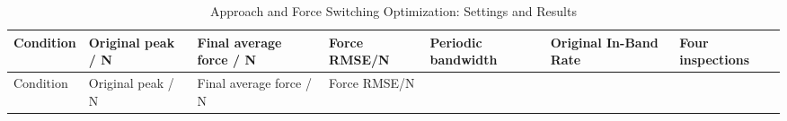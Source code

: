 \FloatBarrier\begingroup\small\setlength{\tabcolsep}{2.5pt}
\begin{longtable}[]{@{}
  >{\raggedright\arraybackslash}p{}
  >{\raggedright\arraybackslash}p{}
  >{\raggedright\arraybackslash}p{}
  >{\raggedright\arraybackslash}p{}
  >{\raggedright\arraybackslash}p{}
  >{\raggedright\arraybackslash}p{}
  >{\raggedright\arraybackslash}p{}@{}}
\caption{Approach and Force Switching Optimization: Settings and Results}\label{tab:s14-1}\tabularnewline
\toprule\noalign{}
\begin{minipage}[b]{\linewidth}\raggedright
Condition
\end{minipage} & \begin{minipage}[b]{\linewidth}\raggedright
Original peak / N
\end{minipage} & \begin{minipage}[b]{\linewidth}\raggedright
Final average force / N
\end{minipage} & \begin{minipage}[b]{\linewidth}\raggedright
Force RMSE/N
\end{minipage} & \begin{minipage}[b]{\linewidth}\raggedright
Periodic bandwidth
\end{minipage} & \begin{minipage}[b]{\linewidth}\raggedright
Original In-Band Rate
\end{minipage} & \begin{minipage}[b]{\linewidth}\raggedright
Four inspections
\end{minipage} \\
\midrule\noalign{}
\endfirsthead
\toprule\noalign{}
\begin{minipage}[b]{\linewidth}\raggedright
Condition
\end{minipage} & \begin{minipage}[b]{\linewidth}\raggedright
Original peak / N
\end{minipage} & \begin{minipage}[b]{\linewidth}\raggedright
Final average force / N
\end{minipage} & \begin{minipage}[b]{\linewidth}\raggedright
Force RMSE/N
\end{minipage} & \begin{minipage}[b]{\linewidth}\raggedright

\end{minipage}
\end{longtable}
